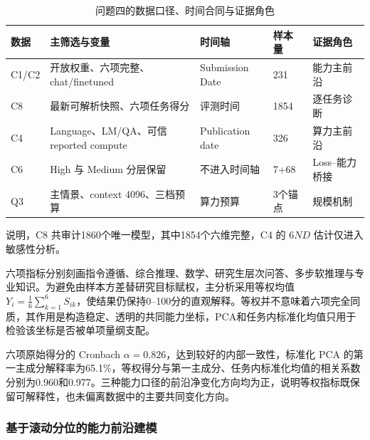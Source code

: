 \documentclass[bwprint]{gmcmthesis}
\newcommand{\CompactTableSetup}{%
    \centering
    \normalsize
    \setlength{\tabcolsep}{4pt}%
    \renewcommand{\arraystretch}{1.08}%
}
\newcommand{\TableNote}[2][0.96\textwidth]{%
    \vspace{0.25em}\par
    \begin{minipage}{#1}
    \normalsize\raggedright #2
    \end{minipage}
}
\begin{document}
\begin{table}[htbp]
    \caption{问题四的数据口径、时间合同与证据角色}
    \label{tab:q4-data-contract}
    \CompactTableSetup
    \setlength{\tabcolsep}{3pt}
    \begin{tabularx}{0.95\textwidth}{@{}P{1.1cm}P{6.0cm}C{3.10cm}C{1.60cm}C{2.80cm}@{}}
        \toprule
        数据    & 主筛选与变量                             & 时间轴              & 样本量  & 证据角色       \\
        \midrule
        C1/C2 & 开放权重、六项完整、chat/finetuned           & Submission Date  & 231  & 能力主前沿      \\
        C8    & 最新可解析快照、六项任务得分                     & 评测时间             & 1854 & 逐任务诊断      \\
        C4    & Language、LM/QA、可信 reported compute & Publication date & 326  & 算力主前沿      \\
        C6    & High 与 Medium 分层保留                 & 不进入时间轴           & 7+68 & Loss--能力桥接 \\
        Q3    & 主情景、context 4096、三档预算              & 算力预算             & 3个锚点 & 规模机制       \\
        \bottomrule
    \end{tabularx}
    \TableNote[\textwidth]{\quad\quad \footnotesize{说明，C8 共审计1860个唯一模型，其中1854个六维完整，C4 的 $6ND$ 估计仅进入敏感性分析。}}
\end{table}

六项指标分别刻画指令遵循、综合推理、数学、研究生层次问答、多步软推理与专业知识。为避免由样本方差替研究目标赋权，主分析采用等权均值 $Y_i=\frac{1}{6}\sum_{k=1}^{6}S_{ik}$，使结果仍保持0--100分的直观解释。等权并不意味着六项完全同质，其作用是构造稳定、透明的共同能力坐标，PCA和任务内标准化均值只用于检验该坐标是否被单项量纲支配。

六项原始得分的 Cronbach $\alpha=0.826$，达到较好的内部一致性，标准化 PCA 的第一主成分解释率为65.1\%，等权得分与第一主成分、任务内标准化均值的相关系数分别为0.960和0.977。三种能力口径的前沿净变化方向均为正，说明等权指标既保留可解释性，也未偏离数据中的主要共同变化方向。

\subsubsection{基于滚动分位的能力前沿建模}
\end{document}
